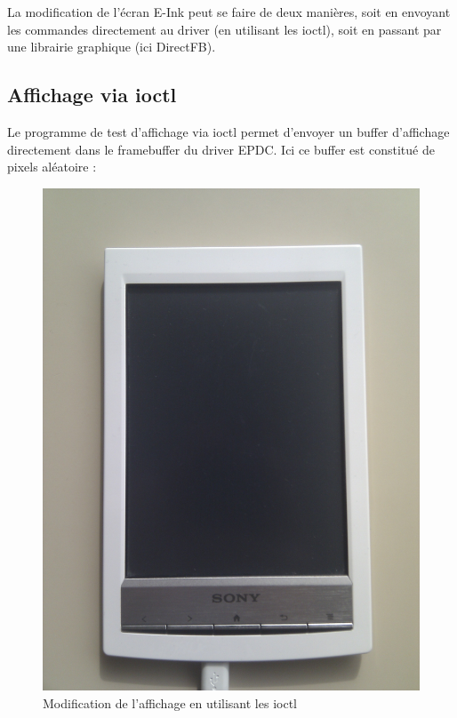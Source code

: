 La modification de l'écran E-Ink peut se faire de deux manières, soit en envoyant les commandes directement au driver (en utilisant les ioctl), soit en passant par une librairie graphique (ici DirectFB).

\subsection{Affichage via ioctl}

Le programme de test d'affichage via ioctl permet d'envoyer un buffer d'affichage directement dans le framebuffer du driver EPDC.
Ici ce buffer est constitué de pixels aléatoire : 
	
	\begin{figure}[h!]
		\begin{center}
			\includegraphics[scale=0.15]{screen_get_temp.jpg}
			 \caption{Modification de l'affichage en utilisant les ioctl}
		\end{center}
	\end{figure}
